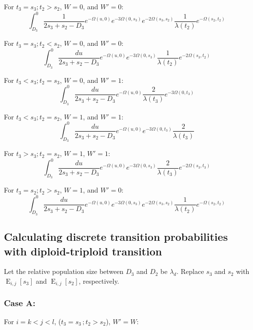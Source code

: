 \documentclass{article}
\DeclareMathOperator{\E}{E}
\begin{document}
For $t_3=s_3;t_2>s_2$, $W = 0$, and $W' = 0$:
\begin{equation*}
    \int_{D_3}^{0}\frac{1}{2s_3+s_2-D_3}e^{-\Omega(u,0)}e^{-3\Omega(0,s_3)}e^{-2\Omega(s_3,s_2)}\frac{1}{\lambda(t_2)}e^{-\Omega(s_2,t_2)}
\end{equation*}

For $t_3=s_3;t_2<s_2$, $W = 0$, and $W' = 0$:
\begin{equation*}
    \int_{D_3}^{0}\frac{du}{2s_3+s_2-D_3}e^{-\Omega(u,0)}e^{-3\Omega(0,s_3)}\frac{1}{\lambda(t_2)}e^{-2\Omega(s_3,t_2)}
\end{equation*}

For $t_3<s_3;t_2=s_3$, $W = 0$, and $W' = 1$:
\begin{equation*}
    \int_{D_3}^{0}\frac{du}{2s_3+s_2-D_3}e^{-\Omega(u,0)}\frac{2}{\lambda(t_3)}e^{-3\Omega(0,t_3)}
\end{equation*}

For $t_3<s_3; t_2=s_2$, $W = 1$, and $W' = 1$:
\begin{equation*}
    \int_{D_3}^{0}\frac{du}{2s_3+s_2-D_3}e^{-\Omega(u,0)}e^{-3\Omega(0,t_3)}\frac{2}{\lambda(t_3)}
\end{equation*}

For $t_3>s_3; t_2=s_2$, $W = 1$, $W' = 1$:
\begin{equation*}
    \int_{D_3}^{0}\frac{du}{2s_3+s_2-D_3}e^{-\Omega(u,0)}e^{-3\Omega(0,s_3)}\frac{2}{\lambda(t_3)}e^{-2\Omega(s_3,t_3)}
\end{equation*}

For $t_3=s_2; t_2>s_2$, $W = 1$, and $W' = 0$:
\begin{equation*}
    \int_{D_3}^{0}\frac{du}{2s_3+s_2-D_3}e^{-\Omega(u,0)}e^{-3\Omega(0,s_3)}e^{-2\Omega(s_3,s_2)}\frac{1}{\lambda(t_2)}e^{-\Omega(s_2,t_2)}
\end{equation*}

\subsection{Calculating discrete transition probabilities with diploid-triploid transition}

Let the relative population size between $D_3$ and $D_2$ be $\lambda_d$.
Replace $s_3$ and $s_2$ with $\E_{i,j}[s_3]$ and $\E_{i,j}[s_2]$, respectively.

\subsubsection{Case A:}
For $i=k< j<l$, ($t_3=s_3\,;t_2>s_2$), $W' = W$:
\end{document}
